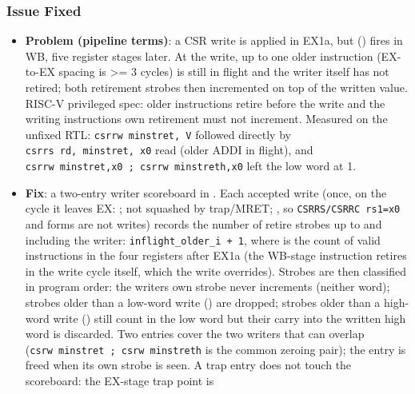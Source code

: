 \subsubsection{Issue Fixed}\label{cr:fix:fixes-index:issue-fixed-9}

\begin{record}

\begin{itemize}
\tightlist
\item
  \textbf{Problem (pipeline terms)}: a CSR write is applied in EX1a, but
   () fires in WB, five register
  stages later. At the write, up to one older instruction (EX-to-EX
  spacing is \textgreater= 3 cycles) is still in flight and the writer
  itself has not retired; both retirement strobes then incremented on
  top of the written value. RISC-V privileged spec: older instructions
  retire before the write and the writing instruction\textquotesingle s
  own retirement must not increment. Measured on the unfixed RTL:
  \texttt{csrrw\ minstret,\allowbreak{}\ V} followed directly by
  \texttt{csrrs\ rd,\allowbreak{}\ minstret,\allowbreak{}\ x0} read
   (older ADDI in flight), and
  \texttt{csrrw\ minstret,\allowbreak{}x0\ ;\ csrrw\ minstreth,\allowbreak{}x0}
  left the low word at 1.
\item
  \textbf{Fix}: a two-entry writer scoreboard in .
  Each accepted write (once, on the cycle it leaves EX:
  ; not squashed by trap/\allowbreak{}MRET;
  , so
  \texttt{CSRRS/\allowbreak{}CSRRC\ rs1=\allowbreak{}x0} and
   forms are not writes) records the number of retire
  strobes up to and including the writer:
  \texttt{inflight\_\allowbreak{}older\_\allowbreak{}i\ +\allowbreak{}\ 1},
  where  is the count of valid instructions in
  the four registers after EX1a (the WB-stage instruction retires in the
  write cycle itself, which the write overrides). Strobes are then
  classified in program order: the writer\textquotesingle s own strobe
  never increments (neither word); strobes older than a low-word write
  () are dropped; strobes older than a high-word write
  () still count in the low word but their carry into
  the written high word is discarded. Two entries cover the two writers
  that can overlap (\texttt{csrw\ minstret\ ;\ csrw\ minstreth} is the
  common zeroing pair); the entry is freed when its own strobe is seen.
  A trap entry does not touch the scoreboard: the EX-stage trap point is

\end{itemize}
\end{record}
